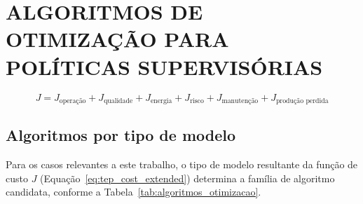 \chapter[ALGORITMOS DE OTIMIZAÇÃO PARA POLÍTICAS SUPERVISÓRIAS]{ALGORITMOS DE OTIMIZAÇÃO PARA POLÍTICAS SUPERVISÓRIAS}
\label{apendice:otimizacao}

%
%

\begin{equation}
	J =
	J_{\text{operação}}
	+ J_{\text{qualidade}}
	+ J_{\text{energia}}
	+ J_{\text{risco}}
	+ J_{\text{manutenção}}
	+ J_{\text{produção perdida}}
	\label{eq:tep_cost_extended}
\end{equation}


\section{Algoritmos por tipo de modelo}
\label{sec:apendice_algoritmos}


Para os casos relevantes a este trabalho, o tipo de modelo resultante da função de
custo $J$ (Equação~\ref{eq:tep_cost_extended}) determina a família de algoritmo
candidata, conforme a Tabela~\ref{tab:algoritmos_otimizacao}.

